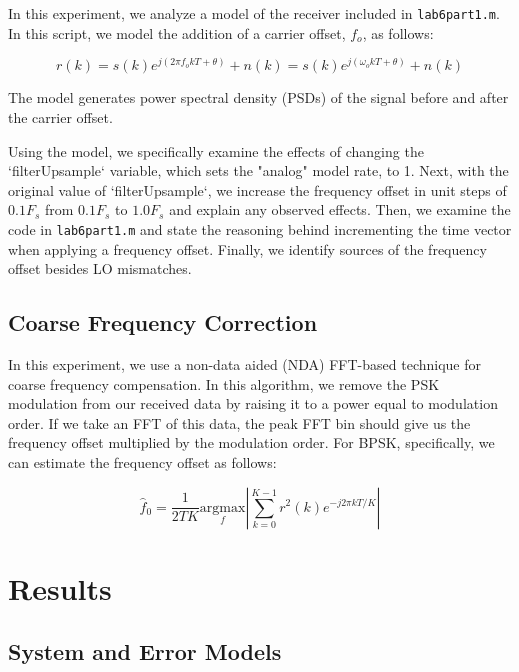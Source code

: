 \documentclass{article}
\begin{document}
In this experiment, we analyze a model of the receiver included in \texttt{lab6part1.m}. In this script, we model the addition of a carrier offset, $f_o$, as follows:

\begin{equation}
	r(k) = s(k)e^{j(2{\pi}f_okT+\theta)}+n(k) = s(k)e^{j(\omega_okT+\theta)}+n(k)
\end{equation}

\noindent The model generates power spectral density (PSDs) of the signal before and after the carrier offset.

Using the model, we specifically examine the effects of changing the `filterUpsample` variable, which sets the "analog" model rate, to 1. Next, with the original value of `filterUpsample`, we increase the frequency offset in unit steps of $0.1F_s$ from $0.1F_s$ to $1.0F_s$ and explain any observed effects. Then, we examine the code in \texttt{lab6part1.m} and state the reasoning behind incrementing the time vector when applying a frequency offset. Finally, we identify sources of the frequency offset besides LO mismatches.

\subsection{Coarse Frequency Correction}

In this experiment, we use a non-data aided (NDA) FFT-based technique for coarse frequency compensation. In this algorithm, we remove the PSK modulation from our received data by raising it to a power equal to modulation order. If we take an FFT of this data, the peak FFT bin should give us the frequency offset multiplied by the modulation order. For BPSK, specifically, we can estimate the frequency offset as follows:

\begin{equation}
	\hat{f}_0 = \frac{1}{2TK}\underset{f}{\text{argmax}}\left\vert\sum_{k=0}^{K-1}{r^2(k)e^{-j2{\pi}kT/K}}\right\vert
\end{equation}

\section{Results}

\subsection{System and Error Models}
\end{document}
